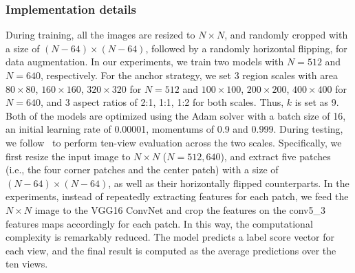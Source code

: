 \documentclass[letterpaper]{article} %
\begin{document}
\subsubsection{Implementation details} 
During training, all the images are resized to $N\times{N}$, and randomly cropped with a size of $(N-64)\times(N-64)$, followed by a randomly horizontal flipping, for data augmentation. In our experiments, we train two models with $N=512$ and $N=640$, respectively. For the anchor strategy, we set 3 region scales with area $80\times{80}$, $160\times{160}$, $320\times{320}$ for $N=512$ and $100\times{100}$, $200\times{200}$, $400\times{400}$ for $N=640$, and 3 aspect ratios of 2:1, 1:1, 1:2 for both scales. Thus, $k$ is set as 9. Both of the models are optimized using the Adam solver with a batch size of 16, an initial learning rate of 0.00001, momentums of 0.9 and 0.999. During testing, we follow~\cite{krizhevsky2012imagenet} to perform ten-view evaluation across the two scales. Specifically, we first resize the input image to $N\times{N}$ ($N=512, 640$), and extract five patches (i.e., the four corner patches and the center patch) with a size of $(N-64)\times(N-64)$, as well as their horizontally flipped counterparts. In the experiments, instead of repeatedly extracting features for each patch, we feed the $N\times{N}$ image to the VGG16 ConvNet and crop the features on the conv5\_3 features maps accordingly for each patch. In this way, the computational complexity is remarkably reduced. The model predicts a label score vector for each view, and the final result is computed as the average predictions over the ten views.
\end{document}
